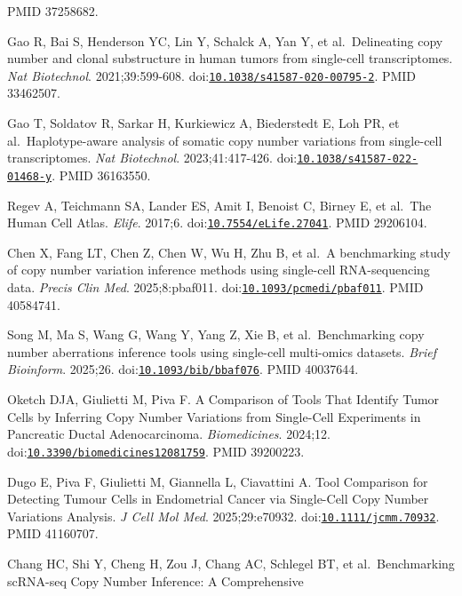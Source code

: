 \documentclass[11pt]{article}
\begin{document}
\begin{enumerate}[label={[\arabic*]},leftmargin=2.6em,labelsep=0.5em,itemsep=1.5pt]
  PMID 37258682.
\item
  Gao R, Bai S, Henderson YC, Lin Y, Schalck A, Yan Y, et
  al.~Delineating copy number and clonal substructure in human tumors
  from single-cell transcriptomes. \emph{Nat Biotechnol}.
  2021;39:599-608.
  doi:\href{https://doi.org/10.1038/s41587-020-00795-2}{\nolinkurl{10.1038/s41587-020-00795-2}}.
  PMID 33462507.
\item
  Gao T, Soldatov R, Sarkar H, Kurkiewicz A, Biederstedt E, Loh PR, et
  al.~Haplotype-aware analysis of somatic copy number variations from
  single-cell transcriptomes. \emph{Nat Biotechnol}. 2023;41:417-426.
  doi:\href{https://doi.org/10.1038/s41587-022-01468-y}{\nolinkurl{10.1038/s41587-022-01468-y}}.
  PMID 36163550.
\item
  Regev A, Teichmann SA, Lander ES, Amit I, Benoist C, Birney E, et
  al.~The Human Cell Atlas. \emph{Elife}. 2017;6.
  doi:\href{https://doi.org/10.7554/eLife.27041}{\nolinkurl{10.7554/eLife.27041}}.
  PMID 29206104.
\item
  Chen X, Fang LT, Chen Z, Chen W, Wu H, Zhu B, et al.~A benchmarking
  study of copy number variation inference methods using single-cell
  RNA-sequencing data. \emph{Precis Clin Med}. 2025;8:pbaf011.
  doi:\href{https://doi.org/10.1093/pcmedi/pbaf011}{\nolinkurl{10.1093/pcmedi/pbaf011}}.
  PMID 40584741.
\item
  Song M, Ma S, Wang G, Wang Y, Yang Z, Xie B, et al.~Benchmarking copy
  number aberrations inference tools using single-cell multi-omics
  datasets. \emph{Brief Bioinform}. 2025;26.
  doi:\href{https://doi.org/10.1093/bib/bbaf076}{\nolinkurl{10.1093/bib/bbaf076}}.
  PMID 40037644.
\item
  Oketch DJA, Giulietti M, Piva F. A Comparison of Tools That Identify
  Tumor Cells by Inferring Copy Number Variations from Single-Cell
  Experiments in Pancreatic Ductal Adenocarcinoma. \emph{Biomedicines}.
  2024;12.
  doi:\href{https://doi.org/10.3390/biomedicines12081759}{\nolinkurl{10.3390/biomedicines12081759}}.
  PMID 39200223.
\item
  Dugo E, Piva F, Giulietti M, Giannella L, Ciavattini A. Tool
  Comparison for Detecting Tumour Cells in Endometrial Cancer via
  Single-Cell Copy Number Variations Analysis. \emph{J Cell Mol Med}.
  2025;29:e70932.
  doi:\href{https://doi.org/10.1111/jcmm.70932}{\nolinkurl{10.1111/jcmm.70932}}.
  PMID 41160707.
\item
  Chang HC, Shi Y, Cheng H, Zou J, Chang AC, Schlegel BT, et
  al.~Benchmarking scRNA-seq Copy Number Inference: A Comprehensive

\end{enumerate}
\end{document}
